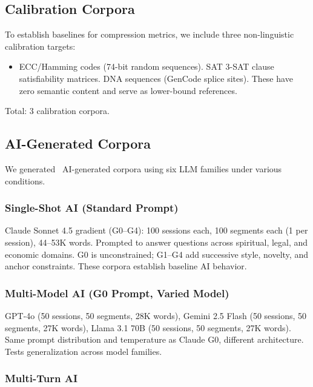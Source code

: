 \documentclass[11pt]{article}
\begin{document}
\subsection{Calibration Corpora}

To establish baselines for compression metrics, we include three non-linguistic calibration targets:

\begin{itemize}
\item ECC/Hamming codes (74-bit random sequences). SAT 3-SAT clause satisfiability matrices. DNA sequences (GenCode splice sites). These have zero semantic content and serve as lower-bound references.
\end{itemize}

Total: 3 calibration corpora.

\subsection{AI-Generated Corpora}

We generated \nAI\ AI-generated corpora using six LLM families under various conditions.

\subsubsection{Single-Shot AI (Standard Prompt)}

Claude Sonnet 4.5 gradient (G0--G4): 100 sessions each, 100 segments each (1 per session), 44--53K words. Prompted to answer questions across spiritual, legal, and economic domains. G0 is unconstrained; G1--G4 add successive style, novelty, and anchor constraints. These corpora establish baseline AI behavior.

\subsubsection{Multi-Model AI (G0 Prompt, Varied Model)}

GPT-4o (50 sessions, 50 segments, 28K words), Gemini 2.5 Flash (50 sessions, 50 segments, 27K words), Llama 3.1 70B (50 sessions, 50 segments, 27K words). Same prompt distribution and temperature as Claude G0, different architecture. Tests generalization across model families.

\subsubsection{Multi-Turn AI}
\end{document}
